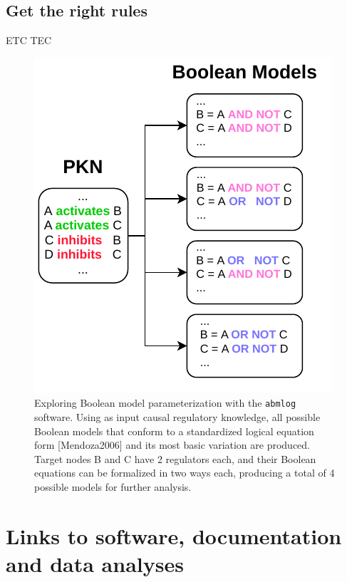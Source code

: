 \documentclass[
  12pt,
]{book}
\begin{document}
\newpage

\hypertarget{gtrr}{%
\section*{Get the right rules}\label{gtrr}}

\indent

ETC TEC



\begin{figure}
\centering
\includegraphics{img/abmlog_simple.pdf}
\caption{\label{fig:fig7}Exploring Boolean model parameterization with the \texttt{abmlog} software. Using as input causal regulatory knowledge, all possible Boolean models that conform to a standardized logical equation form {[}Mendoza2006{]} and its most basic variation are produced. Target nodes B and C have 2 regulators each, and their Boolean equations can be formalized in two ways each, producing a total of 4 possible models for further analysis.}
\end{figure}

\hypertarget{appendix-appendix}{%
\appendix}


\hypertarget{links-to-software-documentation-and-data-analyses}{%
\chapter*{Links to software, documentation and data analyses}\label{links-to-software-documentation-and-data-analyses}}
\end{document}
